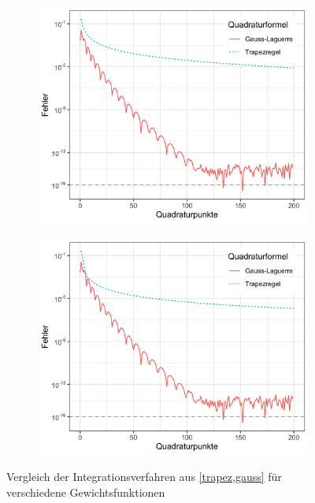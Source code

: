 \documentclass[12pt,a4paper]{scrartcl}
\numberwithin{equation}{section}
\numberwithin{myalgctr}{section}
\numberwithin{mytheoremctr}{subsection}
\numberwithin{mykorollarctr}{subsection}
\numberwithin{mylemmactr}{subsection}
\numberwithin{mybeispielctr}{subsection}
\begin{document}
	
	\begin{figure}[H]
		\begin{subfigure}[t]{0.5\textwidth}
			
			\includegraphics[width=\linewidth]{../plots/vergleich-gauss-trapez-expx.png}
			\label{fig:gauss-vs-trapez-expx}
			
		\end{subfigure}
		\begin{subfigure}[t]{0.5\textwidth}
			\includegraphics[width=\linewidth]{../plots/vergleich-gauss-trapez-expxx.png}
			\label{fig:gauss-vs-trapez-expxx}
		\end{subfigure}
	\caption{Vergleich der Integrationsverfahren aus \cref{trapez,gauss} f\"ur verschiedene Gewichtsfunktionen}\label{fig:gauss-vs-trapez}
	\end{figure}
\end{document}
